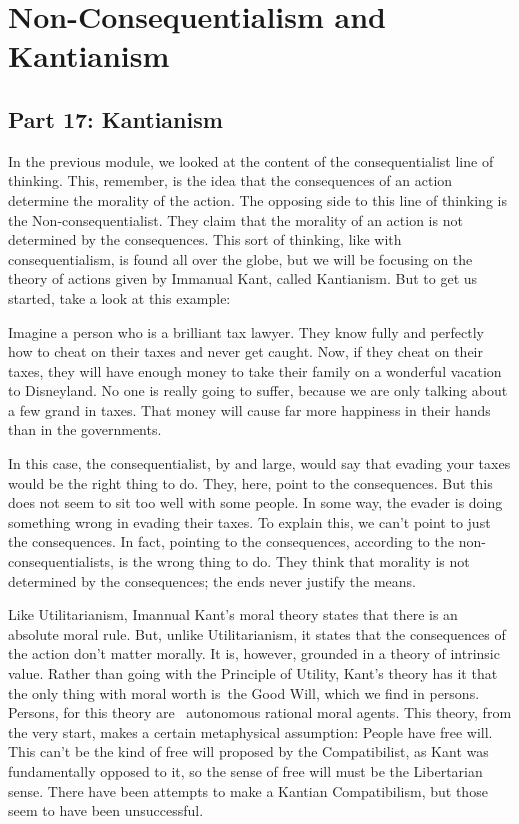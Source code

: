 \part{Non-Consequentialism and Kantianism}
\label{ch.mod6}
\chapter{Part 17: Kantianism}
In the previous module, we looked at the content of the consequentialist line of thinking. This, remember, is the idea that the consequences of an action determine the morality of the action. The opposing side to this line of thinking is the Non-consequentialist. They claim that the morality of an action is not determined by the consequences. This sort of thinking, like with consequentialism, is found all over the globe, but we will be focusing on the theory of actions given by Immanual Kant, called Kantianism. But to get us started, take a look at this example:

Imagine a person who is a brilliant tax lawyer. They know fully and perfectly how to cheat on their taxes and never get caught. Now, if they cheat on their taxes, they will have enough money to take their family on a wonderful vacation to Disneyland. No one is really going to suffer, because we are only talking about a few grand in taxes. That money will cause far more happiness in their hands than in the governments.

In this case, the consequentialist, by and large, would say that evading your taxes would be the right thing to do. They, here, point to the consequences. But this does not seem to sit too well with some people. In some way, the evader is doing something wrong in evading their taxes. To explain this, we can't point to just the consequences. In fact, pointing to the consequences, according to the non-consequentialists, is the wrong thing to do. They think that morality is not determined by the consequences; the ends never justify the means.

Like Utilitarianism, Imannual Kant’s moral theory states that there is an absolute moral rule. But, unlike Utilitarianism, it states that the consequences of the action don't matter morally. It is, however, grounded in a theory of intrinsic value. Rather than going with the Principle of Utility, Kant's theory has it that the only thing with moral worth is the Good Will, which we find in persons. Persons, for this theory are  autonomous rational moral agents. This theory, from the very start, makes a certain metaphysical assumption: People have free will. This can't be the kind of free will proposed by the Compatibilist, as Kant was fundamentally opposed to it, so the sense of free will must be the Libertarian sense. There have been attempts to make a Kantian Compatibilism, but those seem to have been unsuccessful.\autocite{Vilhauer1}


